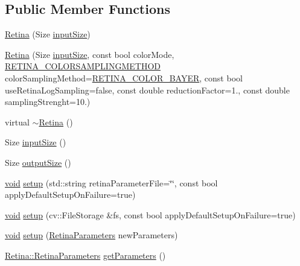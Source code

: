 \subsection*{Public Member Functions}
\begin{DoxyCompactItemize}
\item 
\hyperlink{classcv_1_1Retina_a9e47bd1797d51fdf77b6e20c254920f1}{Retina} (Size \hyperlink{classcv_1_1Retina_ad9a6308217d6ca48a644b046d4e2d97e}{input\-Size})
\item 
\hyperlink{classcv_1_1Retina_a270e864a77f753edd4d3e86e3248bcfb}{Retina} (Size \hyperlink{classcv_1_1Retina_ad9a6308217d6ca48a644b046d4e2d97e}{input\-Size}, const bool color\-Mode, \hyperlink{namespacecv_a1009b8eb0eac217a128fb5752f887287}{R\-E\-T\-I\-N\-A\-\_\-\-C\-O\-L\-O\-R\-S\-A\-M\-P\-L\-I\-N\-G\-M\-E\-T\-H\-O\-D} color\-Sampling\-Method=\hyperlink{namespacecv_a1009b8eb0eac217a128fb5752f887287ae25654a2d7593d5c498cc9229374895a}{R\-E\-T\-I\-N\-A\-\_\-\-C\-O\-L\-O\-R\-\_\-\-B\-A\-Y\-E\-R}, const bool use\-Retina\-Log\-Sampling=false, const double reduction\-Factor=1., const double sampling\-Strenght=10.)
\item 
virtual \hyperlink{classcv_1_1Retina_a671ac1ee95089926649da1c59a03efab}{$\sim$\-Retina} ()
\item 
Size \hyperlink{classcv_1_1Retina_ad9a6308217d6ca48a644b046d4e2d97e}{input\-Size} ()
\item 
Size \hyperlink{classcv_1_1Retina_af762a4a1e791d42923c6ca6c2f99ac37}{output\-Size} ()
\item 
\hyperlink{legacy_8hpp_a8bb47f092d473522721002c86c13b94e}{void} \hyperlink{classcv_1_1Retina_a0dff7fdf4ccb48be6108fbf1eaef09d3}{setup} (std\-::string retina\-Parameter\-File=\char`\"{}\char`\"{}, const bool apply\-Default\-Setup\-On\-Failure=true)
\item 
\hyperlink{legacy_8hpp_a8bb47f092d473522721002c86c13b94e}{void} \hyperlink{classcv_1_1Retina_ab977f15c2f0ea710865c799a6c04fcbb}{setup} (cv\-::\-File\-Storage \&fs, const bool apply\-Default\-Setup\-On\-Failure=true)
\item 
\hyperlink{legacy_8hpp_a8bb47f092d473522721002c86c13b94e}{void} \hyperlink{classcv_1_1Retina_a5c468d8fee7ad6bf002cb5dc5fa83501}{setup} (\hyperlink{structcv_1_1Retina_1_1RetinaParameters}{Retina\-Parameters} new\-Parameters)
\item 
\hyperlink{structcv_1_1Retina_1_1RetinaParameters}{Retina\-::\-Retina\-Parameters} \hyperlink{classcv_1_1Retina_ac5f968a2a04c218ccd4cc0594fa51397}{get\-Parameters} ()
\item 

\end{DoxyCompactItemize}
